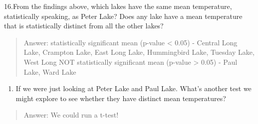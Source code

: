 \documentclass[
]{article}
\providecommand{\tightlist}{%
  \setlength{\itemsep}{0pt}\setlength{\parskip}{0pt}}
\begin{document}
16.From the findings above, which lakes have the same mean temperature,
statistically speaking, as Peter Lake? Does any lake have a mean
temperature that is statistically distinct from all the other lakes?

\begin{quote}
Answer: statistically significant mean (p-value \textless{} 0.05) -
Central Long Lake, Crampton Lake, East Long Lake, Hummingbird Lake,
Tuesday Lake, West Long NOT statistically significant mean (p-value
\textgreater{} 0.05) - Paul Lake, Ward Lake
\end{quote}

\begin{enumerate}
\def\labelenumi{\arabic{enumi}.}
\setcounter{enumi}{16}
\tightlist
\item
  If we were just looking at Peter Lake and Paul Lake. What's another
  test we might explore to see whether they have distinct mean
  temperatures?
\end{enumerate}

\begin{quote}
Answer: We could run a t-test!
\end{quote}
\end{document}
